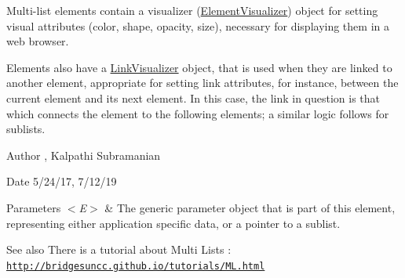 Multi-\/list elements contain a visualizer (\hyperlink{classbridges_1_1datastructure_1_1_element_visualizer}{Element\+Visualizer}) object for setting visual attributes (color, shape, opacity, size), necessary for displaying them in a web browser.

Elements also have a \hyperlink{classbridges_1_1datastructure_1_1_link_visualizer}{Link\+Visualizer} object, that is used when they are linked to another element, appropriate for setting link attributes, for instance, between the current element and its next element. In this case, the link in question is that which connects the element to the following elements; a similar logic follows for sublists.

\begin{DoxyAuthor}{Author}
, Kalpathi Subramanian
\end{DoxyAuthor}
\begin{DoxyDate}{Date}
5/24/17, 7/12/19
\end{DoxyDate}

\begin{DoxyParams}{Parameters}
{\em $<$\+E$>$} & The generic parameter object that is part of this element, representing either application specific data, or a pointer to a sublist.\\
\hline
\end{DoxyParams}
\begin{DoxySeeAlso}{See also}
There is a tutorial about Multi Lists \+: \href{http://bridgesuncc.github.io/tutorials/ML.html}{\tt http\+://bridgesuncc.\+github.\+io/tutorials/\+M\+L.\+html} 
\end{DoxySeeAlso}
